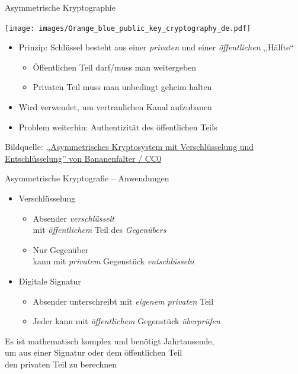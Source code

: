   \begin{frame}{Asymmetrische Kryptographie}
    \begin{center}
      \texttt{[image: images/Orange\_blue\_public\_key\_cryptography\_de.pdf]}
    \end{center}
    \begin{itemize}
      \item Prinzip: Schlüssel besteht aus einer \emph{privaten} und einer \emph{öffentlichen} ,,Hälfte``
      \begin{itemize}
        \item Öffentlichen Teil darf/muss man weitergeben
        \item Privaten Teil muss man unbedingt geheim halten
      \end{itemize}
      \item Wird verwendet, um vertraulichen Kanal aufzubauen
      \item Problem weiterhin: Authentizität des öffentlichen Teils
    \end{itemize}
    \tiny Bildquelle: \href{https://commons.wikimedia.org/wiki/File:Orange_blue_public_key_cryptography_de.svg}{,,Asymmetrisches Kryptosystem mit Verschlüsselung und Entschlüsselung'' von Bananenfalter / CC0}
  \end{frame}

  \begin{frame}{Asymmetrische Kryptografie -- Anwendungen}
    \begin{itemize}
      \item Verschlüsselung
        \begin{itemize}
          \item Absender \emph{verschlüsselt}\\ mit \emph{öffentlichem} Teil des \emph{Gegenübers}
          \item Nur Gegenüber\\ kann mit \emph{privatem} Gegenstück \emph{entschlüsseln}
        \end{itemize}
      \item Digitale Signatur
        \begin{itemize}
          \item Absender unterschreibt mit \emph{eigenem privaten} Teil
          \item Jeder kann mit \emph{öffentlichem} Gegenstück \emph{überprüfen}
        \end{itemize}
    \end{itemize}
    Es ist mathematisch komplex und benötigt Jahrtausende,\\ um aus einer Signatur oder dem öffentlichen Teil\\ den privaten Teil zu berechnen
  \end{frame}

